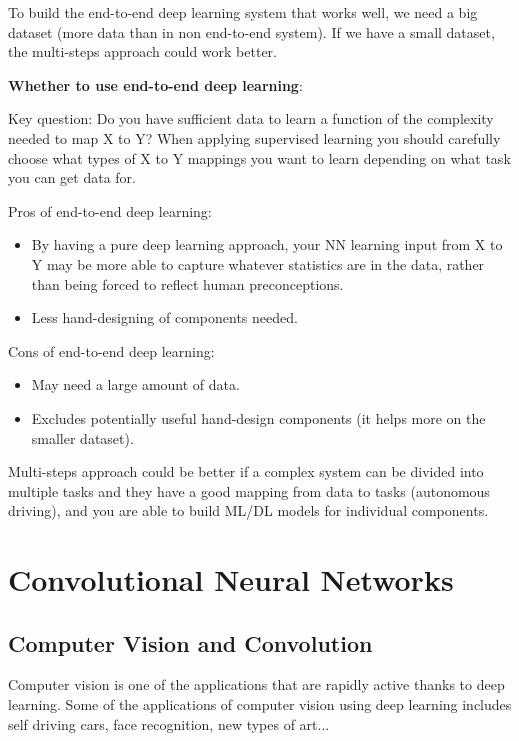 \documentclass{article}
\begin{document}
\noindent To build the end-to-end deep learning system that works well, we need a big dataset (more data than in non end-to-end system). If we have a small dataset, the multi-steps approach could work better.

\bigskip

\noindent \textbf{Whether to use end-to-end deep learning}:

\noindent Key question: Do you have sufficient data to learn a function of the complexity needed to map X to Y? When applying supervised learning you should carefully choose what types of X to Y mappings you want to learn depending on what task you can get data for.

\bigskip

\noindent Pros of end-to-end deep learning:

\begin{itemize}
    \item By having a pure deep learning approach, your NN learning input from X to Y may be more able to capture whatever statistics are in the data, rather than being forced to reflect human preconceptions.
    \item Less hand-designing of components needed.
\end{itemize}

\noindent Cons of end-to-end deep learning:

\begin{itemize}
    \item May need a large amount of data.
    \item Excludes potentially useful hand-design components (it helps more on the smaller dataset).
\end{itemize}

\noindent Multi-steps approach could be better if a complex system can be divided into multiple tasks and they have a good mapping from data to tasks (autonomous driving), and you are able to build ML/DL models for individual components.

\section{Convolutional Neural Networks}

\subsection{Computer Vision and Convolution}

\noindent Computer vision is one of the applications that are rapidly active thanks to deep learning. Some of the applications of computer vision using deep learning includes self driving cars, face recognition, new types of art...
\end{document}
